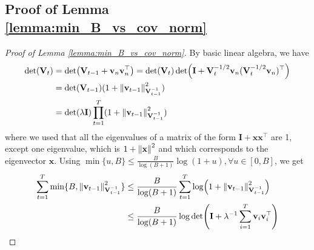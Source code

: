 \subsection{Proof of Lemma \ref{lemma:min_B_vs_cov_norm}}
\label{min_B_vs_cov_norm_proof}
\begin{proof}[Proof of Lemma \ref{lemma:min_B_vs_cov_norm}]

By basic linear algebra, we have 
\begin{equation*}
\begin{split}
    \det (\mathbf{V}_t)  & = \det (\mathbf{V}_{t-1} + \mathbf{v}_n\mathbf{v}_n^\top) = \det(\mathbf{V}_t)\det(\mathbf{I}+\mathbf{V}_t^{-1/2}\mathbf{v}_n(\mathbf{V}_t^{-1/2}\mathbf{v}_n)^\top) \\
  & = \det(\mathbf{V}_{t-1})(1+\norm{\mathbf{v}_{t-1}}^2_{\mathbf{V}_{t-1}^{-1}}) \\
  & = \det (\lambda \mathbf{I}) \prod_{t=1}^T (1+\norm{\mathbf{v}_{t-1}}^2_{\mathbf{V}_{t-1}^{-1}}) \\
\end{split}
\end{equation*}
where we used that all the eigenvalues of a matrix of the form $\mathbf{I} + \mathbf{x}\mathbf{x}^\top$ are 1, except one eigenvalue, which is $1+\norm{\mathbf{x}}^2$ and which corresponds to the eigenvector $\mathbf{x}$. Using $\min\{u,B\} \leq \frac{B}{\log(B+1)}\log(1+u), \forall u \in [0,B]$, we get 
\begin{equation*}
    \begin{split}
        \sum_{t=1}^T \min \{B,\norm{\mathbf{v}_{t-1}}^2_{\mathbf{V}_{t-1}^{-1}}\} & \leq \frac{B}{\log(B+1)} \sum_{t=1}^T \log (1+\norm{\mathbf{v}_{t-1}}^2_{\mathbf{V}_{t-1}^{-1}}) \\
        & \leq \frac{B}{\log(B+1)} \log \det (\mathbf{I} + \lambda^{-1}\sum_{i=1}^T \mathbf{v}_i\mathbf{v}_i^\top )
    \end{split}
\end{equation*}
\end{proof}

